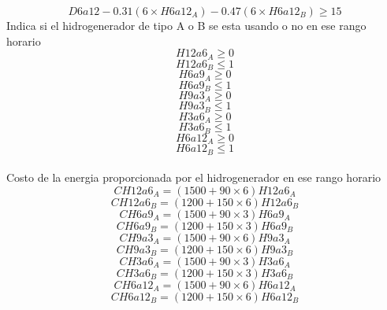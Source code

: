 \begin{equation}
D6a12 - 0.31 (6 \times H6a12_{A}) - 0.47 (6 \times H6a12_{B}) \geq 15    
\end{equation}
Indica si el hidrogenerador de tipo A o B se esta usando o no en ese rango horario
\begin{equation}
H12a6_{A} \geq 0
\end{equation}
\begin{equation}
H12a6_{B} \leq 1
\end{equation}
\begin{equation}
H6a9_{A} \geq 0 
\end{equation}
\begin{equation}
H6a9_{B} \leq 1
\end{equation}
\begin{equation}
H9a3_{A} \geq 0
\end{equation}
\begin{equation}
H9a3_{B} \leq 1
\end{equation}
\begin{equation}
H3a6_{A} \geq 0 
\end{equation}
\begin{equation}
H3a6_{B} \leq 1
\end{equation}
\begin{equation}
H6a12_{A} \geq 0 
\end{equation}
\begin{equation}
H6a12_{B} \leq 1
\end{equation}
\\
Costo de la energia proporcionada por el hidrogenerador en ese rango horario
\begin{equation}
CH12a6_{A} = (1500 + 90 \times 6) H12a6_{A}
\end{equation}
\begin{equation}
CH12a6_{B} = (1200 + 150 \times 6) H12a6_{B}  
\end{equation}
\begin{equation}
CH6a9_{A} = (1500 + 90 \times 3) H6a9_{A}
\end{equation}
\begin{equation}
CH6a9_{B} = (1200 + 150 \times 3) H6a9_{B} 
\end{equation}
\begin{equation}
CH9a3_{A} = (1500 + 90 \times 6) H9a3_{A}
\end{equation}
\begin{equation}
CH9a3_{B} = (1200 + 150 \times 6) H9a3_{B}  
\end{equation}
\begin{equation}
CH3a6_{A} = (1500 + 90 \times 3) H3a6_{A}
\end{equation}
\begin{equation}
CH3a6_{B} = (1200 + 150 \times 3) H3a6_{B} 
\end{equation}
\begin{equation}
CH6a12_{A} = (1500 + 90 \times 6) H6a12_{A}
\end{equation}
\begin{equation}
CH6a12_{B} = (1200 + 150 \times 6) H6a12_{B}
\end{equation}